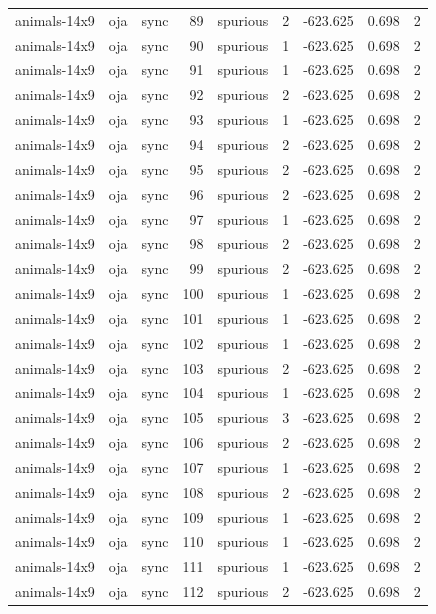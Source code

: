 \begin{tabular}{lllrlrrrr}
animals-14x9 & oja & sync & 89 & spurious & 2 & -623.625 & 0.698 & 2 \\
animals-14x9 & oja & sync & 90 & spurious & 1 & -623.625 & 0.698 & 2 \\
animals-14x9 & oja & sync & 91 & spurious & 1 & -623.625 & 0.698 & 2 \\
animals-14x9 & oja & sync & 92 & spurious & 2 & -623.625 & 0.698 & 2 \\
animals-14x9 & oja & sync & 93 & spurious & 1 & -623.625 & 0.698 & 2 \\
animals-14x9 & oja & sync & 94 & spurious & 2 & -623.625 & 0.698 & 2 \\
animals-14x9 & oja & sync & 95 & spurious & 2 & -623.625 & 0.698 & 2 \\
animals-14x9 & oja & sync & 96 & spurious & 2 & -623.625 & 0.698 & 2 \\
animals-14x9 & oja & sync & 97 & spurious & 1 & -623.625 & 0.698 & 2 \\
animals-14x9 & oja & sync & 98 & spurious & 2 & -623.625 & 0.698 & 2 \\
animals-14x9 & oja & sync & 99 & spurious & 2 & -623.625 & 0.698 & 2 \\
animals-14x9 & oja & sync & 100 & spurious & 1 & -623.625 & 0.698 & 2 \\
animals-14x9 & oja & sync & 101 & spurious & 1 & -623.625 & 0.698 & 2 \\
animals-14x9 & oja & sync & 102 & spurious & 1 & -623.625 & 0.698 & 2 \\
animals-14x9 & oja & sync & 103 & spurious & 2 & -623.625 & 0.698 & 2 \\
animals-14x9 & oja & sync & 104 & spurious & 1 & -623.625 & 0.698 & 2 \\
animals-14x9 & oja & sync & 105 & spurious & 3 & -623.625 & 0.698 & 2 \\
animals-14x9 & oja & sync & 106 & spurious & 2 & -623.625 & 0.698 & 2 \\
animals-14x9 & oja & sync & 107 & spurious & 1 & -623.625 & 0.698 & 2 \\
animals-14x9 & oja & sync & 108 & spurious & 2 & -623.625 & 0.698 & 2 \\
animals-14x9 & oja & sync & 109 & spurious & 1 & -623.625 & 0.698 & 2 \\
animals-14x9 & oja & sync & 110 & spurious & 1 & -623.625 & 0.698 & 2 \\
animals-14x9 & oja & sync & 111 & spurious & 1 & -623.625 & 0.698 & 2 \\
animals-14x9 & oja & sync & 112 & spurious & 2 & -623.625 & 0.698 & 2 \\

\end{tabular}
